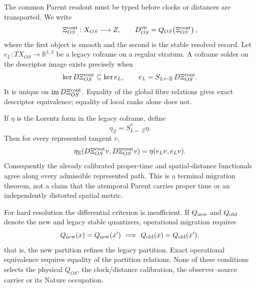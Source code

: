 \documentclass[11pt]{article}
\begin{document}
The common Parent readout must be typed before clocks or distances are
transported.  We write
\begin{equation}
 \Xi^{\rm cont}_{OS}:X_{OS}\longrightarrow Z,
 \qquad
 D^{\rm op}_{OS}=Q_{OS}\!\left(\Xi^{\rm cont}_{OS}\right),
 \label{eq:paperv-continuous-operational-readout}
\end{equation}
where the first object is smooth and the second is the stable resolved
record.  Let \(e_L:TX_{OS}\to\mathbb R^{1,3}\) be a legacy coframe on a
regular stratum.  A coframe solder on the descriptor image exists precisely
when
\begin{equation}
 \ker D\Xi^{\rm cont}_{OS}\subseteq\ker e_L,
 \qquad
 e_L=S_{L\leftarrow\Xi}\,D\Xi^{\rm cont}_{OS}.
 \label{eq:paperv-t4d-t62}
\end{equation}
It is unique on \(\operatorname{im}D\Xi^{\rm cont}_{OS}\).  Equality of the
global fibre relations gives exact descriptor equivalence; equality of local
ranks alone does not.

If \(\eta\) is the Lorentz form in the legacy coframe, define
\begin{equation}
 \eta_\Xi=S_{L\leftarrow\Xi}^{*}\eta .
 \label{eq:paperv-pulled-lorentz-metric}
\end{equation}
Then for every represented tangent \(v\),
\begin{equation}
 \eta_\Xi(D\Xi^{\rm cont}_{OS}v,D\Xi^{\rm cont}_{OS}v)
 =\eta(e_Lv,e_Lv).
 \label{eq:paperv-t4d-c45}
\end{equation}
Consequently the already calibrated proper-time and spatial-distance
functionals agree along every admissible represented path.  This is a
terminal migration theorem, not a claim that the atemporal Parent carries
proper time or an independently distorted spatial metric.

For hard resolution the differential criterion is insufficient.  If
\(Q_{\rm new}\) and \(Q_{\rm old}\) denote the new and legacy stable
quantizers, operational migration requires
\begin{equation}
 Q_{\rm new}(x)=Q_{\rm new}(x')
 \ \Longrightarrow\
 Q_{\rm old}(x)=Q_{\rm old}(x'),
 \label{eq:paperv-hard-quantizer-partition}
\end{equation}
that is, the new partition refines the legacy partition.  Exact operational
equivalence requires equality of the partition relations.  None of these
conditions selects the physical \(Q_{OS}\), the clock/distance calibration,
the observer--source carrier or its Nature occupation.
\end{document}
